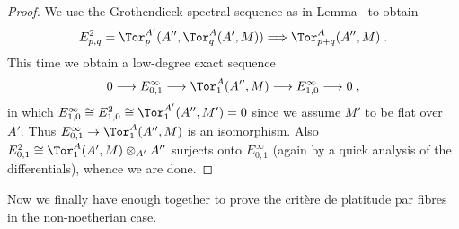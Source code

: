 \documentclass[a4paper,parskip=half,numbers=enddot, DIV=12]{scrreprt}
\begin{document}
\begin{proof}
	We use the Grothendieck spectral sequence as in Lemma~ to obtain
	\begin{align*}
	E_{p,q}^2=\Tor_p^{A'}(A'',\Tor_q^A(A',M))\converge \Tor_{p+q}^A(A'',M)\;.
	\end{align*}
	This time we obtain a low-degree exact sequence
	\begin{align*}
	0\morphism E_{0,1}^\infty\morphism\Tor_1^A(A'',M)\morphism E_{1,0}^\infty\morphism 0\;,
	\end{align*}
	in which $E_{1,0}^\infty\cong E_{1,0}^2\cong \Tor_1^{A'}(A'',M')=0$ since we assume $M'$ to be flat over $A'$. Thus $E_{0,1}^\infty\morphism \Tor_1^A(A'',M)$ is an isomorphism. Also $E_{0,1}^2\cong \Tor_1^A(A',M)\otimes_{A'}A''$ surjects onto $E_{0,1}^\infty$ (again by a quick analysis of the differentials), whence we are done.
\end{proof}
Now we finally have enough together to prove the critère de platitude par fibres in the non-noetherian case.
\end{document}
